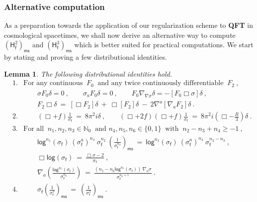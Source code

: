 \documentclass[11pt]{book}
\newcommand{\ms}{\mathsf{ms}}
\renewcommand{\log}{\mathsf{log}}
\newcommand{\Nbb}{\mathbb{N}}
\newcommand{\Hsf}{\mathsf{H}}
\newcommand{\fsf}{\mathsf{f}}
\theoremstyle{break}
\newtheorem{lemma}{Lemma}[chapter]
\begin{document}
\subsubsection{Alternative computation}


As a preparation towards the application of our regularization scheme to \textbf{QFT} in cosmological spacetimes, we shall now derive an alternative way to compute $\left(\Hsf_\fsf^2\right)_\ms$ and $\left(\Hsf_\fsf^3\right)_\ms$ which is better suited for practical computations. We start by stating and proving a few distributional identities.


\begin{lemma}\label{lem:product_identities}
The following distributional identities hold.
%
\begin{eqnarray*}
%
&1.& \mbox{For any continuous } \ F_0 \ \mbox{ and any twice continuously differentiable } \  F_2 \ , \\
&& \qquad \sigma F_0 \delta = 0 \ , \qquad \sigma_a F_0 \delta = 0 \ , \qquad F_0 \nabla_{\nabla\sigma} \delta = - [F_0 \Box \sigma] \delta \ ,  \\
&& \qquad F_2 \Box \delta \ = \ [\Box F_2]\delta \ + \ \Box [F_2]\delta \ - \ 2\nabla^a[\nabla_aF_2]\delta \ .\\
%
&2.& \qquad (\Box+f)\frac{1}{\sigma_\fsf} \ = \ 8\pi^2i\delta \ , \qquad (\Box+2f)(\Box+f)\frac{1}{\sigma_\fsf} \ = \ 8\pi^2i \left(\Box-\frac R3\right)\delta \ . \\
%
&3.& \mbox{For all } \ n_1, n_2, n_3 \in \Nbb_0 \ \mbox{ and } n_4, n_5, n_6 \in \{0,1\} \ \mbox{ with } \ n_2-n_3+n_4 \geq - 1 \ , \\
&& \qquad \log^{n_1}\left(\sigma_\fsf\right) \ (\sigma^a_\fsf)^{n_4} \ \sigma^{n_2}_\fsf \ \left(\frac{1}{\sigma_\fsf^{n_3}}\right)_\ms \ = \ \log^{n_1}\left(\sigma_\fsf\right) \ (\sigma^a_\fsf)^{n_4} \ \sigma^{n_2-n_3}_\fsf \ , \\
&& \qquad \Box \log(\sigma_\fsf) \ = \ \frac{\Box \sigma -2}{\sigma_\fsf} \ , \\
&& \qquad \nabla_a\left(\frac{\log^{n_5}(\sigma_\fsf)}{\sigma^{n_6}_\fsf}\right) \ = \ \frac{\left(n_5-n_6\log^{n_5}(\sigma_\fsf)\right) \ \nabla_a \sigma}{\sigma^{n_6+1}_\fsf} \ . \\
%
&4.& \qquad \sigma_\fsf\left(\frac{1}{\sigma_\fsf^3}\right)_\ms \ = \ \left(\frac{1}{\sigma_\fsf^2}\right)_\ms \ .
%
\end{eqnarray*}
%
\end{lemma}
\end{document}
